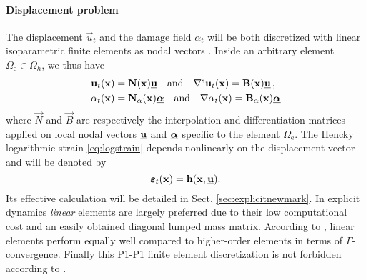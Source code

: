 \paragraph{Displacement problem} The displacement $\vec{u}_t$ and the damage field $\alpha_t$ will be both discretized with linear isoparametric finite elements as nodal vectors \cite{PhamAmorMarigoMaurini:2011,MesgarnejadBourdinKhonsari:2014}. Inside an arbitrary element $\Omega_\mathrm{e}\in\Omega_h$, we thus have
\begin{align*}
& \vec{u}_t(\vec{x})=\vec{N}(\vec{x})\uvec\quad\text{and}\quad\symgrad\vec{u}_t(\vec{x})=\vec{B}(\vec{x})\uvec\, , \\
& \alpha_t(\vec{x})=\vec{N}_\alpha(\vec{x})\dvec\quad\text{and}\quad\nabla\alpha_t(\vec{x})=\vec{B}_\alpha(\vec{x})\dvec
\end{align*}
where $\vec{N}$ and $\vec{B}$ are respectively the interpolation and differentiation matrices applied on local nodal vectors $\uvec$ and $\dvec$ specific to the element $\Omega_\mathrm{e}$. The Hencky logarithmic strain \eqref{eq:logstrain} depends nonlinearly on the displacement vector and will be denoted by
\begin{equation}
\eps_t(\vec{x})=\vec{h}(\vec{x},\uvec).
\end{equation}
Its effective calculation will be detailed in Sect. \ref{sec:explicitnewmark}. In explicit dynamics \emph{linear} elements are largely preferred due to their low computational cost and an easily obtained diagonal lumped mass matrix. According to \cite{BourdinFrancfortMarigo:2008}, linear elements perform equally well compared to higher-order elements in terms of $\Gamma$-convergence. Finally this P1-P1 finite element discretization is not forbidden according to \cite{SimoneAskesPeerlingsSluys:2003}.

